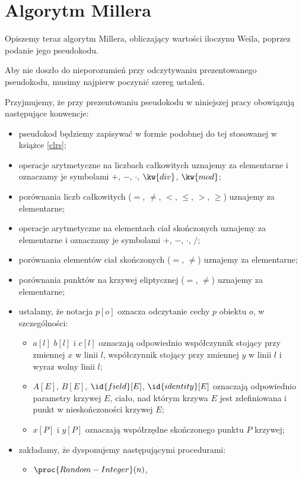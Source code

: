 \section{Algorytm Millera}

Opiszemy teraz algorytm Millera,
obliczający wartości iloczynu Weila,
poprzez podanie jego pseudokodu.

Aby nie doszło do nieporozumień przy odczytywaniu
prezentowanego pseudokodu,
musimy najpierw poczynić szereg ustaleń.

\begin{remark}
Przyjmujemy, że przy prezentowaniu pseudokodu w niniejszej pracy
obowiązują następujące konwencje:
\begin{itemize}
\item pseudokod będziemy zapisywać w formie podobnej do tej
stosowanej w książce \ref{clrs};
\item operacje arytmetyczne na liczbach całkowitych
uznajemy za elementarne
i oznaczamy je symbolami $+$, $-$, $\cdot$, $\kw{div}$, $\kw{mod}$;
\item porównania liczb całkowitych ($=$, $\neq$, $<$, $\leq$, $>$, $\geq$)
uznajemy za elementarne;
\item operacje arytmetyczne na elementach ciał skończonych
uznajemy za elementarne
i oznaczamy je symbolami $+$, $-$, $\cdot$, $/$;
\item porównania elementów ciał skończonych ($=$, $\neq$)
uznajemy za elementarne;
\item porównania punktów na krzywej eliptycznej ($=$, $\neq$)
uznajemy za elementarne;
\item ustalamy, że notacja $p[o]$ oznacza odczytanie cechy $p$ obiektu $o$,
w szczególności:
\begin{itemize}
\item $a[l]$ $b[l]$ i $c[l]$ oznaczają odpowiednio
współczynnik stojący przy zmiennej $x$ w linii $l$,
współczynnik stojący przy zmiennej $y$ w linii $l$
i wyraz wolny linii $l$;
\item $A[E]$, $B[E]$, $\id{field}[E]$, $\id{identity}[E]$
oznaczają odpowiednio
parametry krzywej $E$, ciało, nad którym krzywa $E$ jest zdefiniowana
i punkt w nieskończoności krzywej $E$;
\item $x[P]$ i $y[P]$ oznaczają współrzędne skończonego punktu $P$ krzywej;
\end{itemize}
\item zakładamy, że dysponujemy następującymi procedurami:
\begin{itemize}
\item $\proc{Random-Integer}(n)$, 

\end{itemize}
\end{itemize}
\end{remark}
